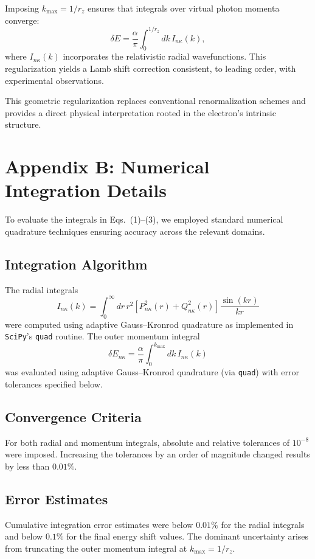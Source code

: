 \documentclass[12pt]{article}
\begin{document}
Imposing \(k_{\mathrm{max}} = 1/r_z\) ensures that integrals over virtual photon momenta converge:
\[
\delta E = \frac{\alpha}{\pi}\int_0^{1/r_z} dk\,I_{n\kappa}(k),
\]
where \(I_{n\kappa}(k)\) incorporates the relativistic radial wavefunctions. This regularization yields a Lamb shift correction consistent, to leading order, with experimental observations.

\medskip
This geometric regularization replaces conventional renormalization schemes and provides a direct physical interpretation rooted in the electron’s intrinsic structure.

\section*{Appendix B: Numerical Integration Details}

To evaluate the integrals in Eqs.~(1)--(3), we employed standard numerical quadrature techniques ensuring accuracy across the relevant domains.

\subsection*{Integration Algorithm}
The radial integrals
\[
I_{n\kappa}(k) = \int_0^{\infty} dr\, r^2 \left[P_{n\kappa}^2(r) + Q_{n\kappa}^2(r)\right] \frac{\sin(kr)}{kr}
\]
were computed using adaptive Gauss--Kronrod quadrature as implemented in \texttt{SciPy}'s \texttt{quad} routine. The outer momentum integral
\[
\delta E_{n\kappa} = \frac{\alpha}{\pi} \int_0^{k_{\mathrm{max}}} dk\, I_{n\kappa}(k)
\]
was evaluated using adaptive Gauss–Kronrod quadrature (via \texttt{quad}) with error tolerances specified below.

\subsection*{Convergence Criteria}
For both radial and momentum integrals, absolute and relative tolerances of \(10^{-8}\) were imposed. Increasing the tolerances by an order of magnitude changed results by less than \(0.01\%\).

\subsection*{Error Estimates}
Cumulative integration error estimates were below \(0.01\%\) for the radial integrals and below \(0.1\%\) for the final energy shift values. The dominant uncertainty arises from truncating the outer momentum integral at \(k_{\mathrm{max}} = 1/r_z\).
\end{document}
